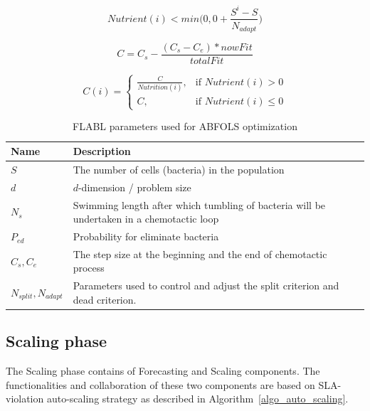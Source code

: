 \documentclass[runningheads]{llncs}
\begin{document}
\begin{equation} \label{eq_dead}
Nutrient(i) < \displaystyle min\Big( 0, 0 + \frac{S^i - S}{ N_{adapt} } \Big)
\end{equation}

\begin{equation} \label{eq_step_size_general}
C = \displaystyle C_s - \frac{ (C_s - C_e) * nowFit }{ totalFit } 
\end{equation}

\begin{equation} \label{eq_step_size_i}
C(i) = \begin{cases}  \displaystyle \frac{C}{Nutrition(i)} , & \mbox{if } Nutrient(i) > 0\\ C, & \mbox{if } Nutrient(i) \leq 0 \end{cases}
\end{equation}
\normalsize

\begin{table}[!h]
\begin{center}
\begin{tabular}{ |C{2cm}| C{10cm} | } 
\hline
\textbf{Name} & \textbf{Description} \\ \hline
$S$ & The number of cells (bacteria) in the population \\ \hline
$d$ & $d$-dimension / problem size \\ \hline
$N_s$ & Swimming length after which tumbling of bacteria will be undertaken in a chemotactic loop \\ \hline
$P_{ed}$ & Probability for eliminate bacteria \\ \hline
$C_s, C_e$ & The step size at the beginning and the end of chemotactic process\\ \hline
$N_{split}, N_{adapt}$ & Parameters used to control and adjust the split criterion and dead criterion. \\ \hline
\end{tabular}
\end{center}
\caption{FLABL parameters used for ABFOLS optimization}
\label{table:bfo_paras}
\end{table}




\subsection{Scaling phase}
\label{scaling_phase}

The Scaling phase contains of Forecasting and Scaling components. The functionalities and collaboration of these two components are based on SLA-violation auto-scaling strategy as described in Algorithm~\ref{algo_auto_scaling}.
\end{document}
